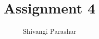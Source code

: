 \documentclass[journal,12pt,twocolumn]{IEEEtran}
\begin{document}
\makeatother
\let\StandardTheFigure\thefigure
\let\vec\mathbf
\renewcommand{\thefigure}{\theproblem}
\def\putbox#1#2#3{\makebox[0in][l]{\makebox[#1][l]{}\raisebox{\baselineskip}[0in][0in]{\raisebox{#2}[0in][0in]{#3}}}}
     \def\rightbox#1{\makebox[0in][r]{#1}}
     \def\centbox#1{\makebox[0in]{#1}}
     \def\topbox#1{\raisebox{-\baselineskip}[0in][0in]{#1}}
     \def\midbox#1{\raisebox{-0.5\baselineskip}[0in][0in]{#1}}
\vspace{3cm}
\title{Assignment 4}
\author{Shivangi Parashar}
%
%
%
%
%
\end{document}
